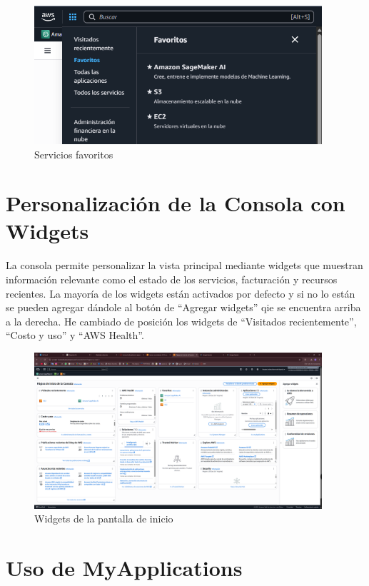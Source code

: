 \documentclass{article}
\begin{document}
	\begin{figure}[h!]
		\centering
		\includegraphics[width=0.95\textwidth]{tarea_2.png}
		\caption{Servicios favoritos}
		\end{figure}
	
	\newpage
	
	\section{Personalización de la Consola con Widgets}

	La consola permite personalizar la vista principal mediante widgets que muestran información relevante como el estado de los servicios, facturación y recursos recientes. La mayoría de los widgets están activados por defecto y si no lo están se pueden agregar dándole al botón de ``Agregar widgets'' qie se encuentra arriba a la derecha. He cambiado de posición los widgets de ``Visitados recientemente'', ``Costo y uso'' y ``AWS Health''.

	\begin{figure}[h!]
	\centering
	\includegraphics[width=0.95\textwidth]{tarea_3.png}
	\caption{Widgets de la pantalla de inicio}
	\end{figure}


	\section{Uso de MyApplications}
\end{document}
